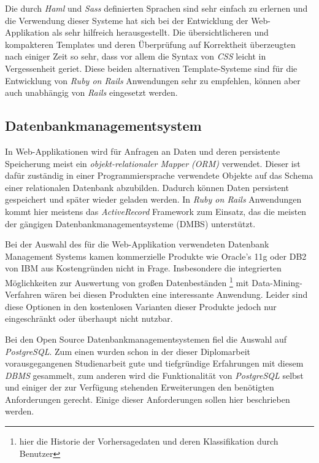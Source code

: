 Die durch \textit{Haml} und \textit{Sass} definierten Sprachen sind
sehr einfach zu erlernen und die Verwendung dieser Systeme hat sich
bei der Entwicklung der Web-Applikation als sehr hilfreich
herausgestellt. Die übersichtlicheren und kompakteren Templates und
deren Überprüfung auf Korrektheit überzeugten nach einiger Zeit so
sehr, dass vor allem die Syntax von \textit{CSS} leicht in
Vergessenheit geriet. Diese beiden alternativen Template-Systeme sind
für die Entwicklung von \textit{Ruby on Rails} Anwendungen sehr zu
empfehlen, können aber auch unabhängig von \textit{Rails} eingesetzt
werden.

\subsection{Datenbankmanagementsystem}

In Web-Applikationen wird für Anfragen an Daten und deren persistente
Speicherung meist ein \textit{objekt-relationaler Mapper (ORM)}
verwendet. Dieser ist dafür zuständig in einer Programmiersprache
verwendete Objekte auf das Schema einer relationalen Datenbank
abzubilden. Dadurch können Daten persistent gespeichert und später
wieder geladen werden. In \textit{Ruby on Rails} Anwendungen kommt
hier meistens das \textit{ActiveRecord} Framework zum Einsatz, das die
meisten der gängigen Datenbankmanagementsysteme (DMBS) unterstützt.

Bei der Auswahl des für die Web-Applikation verwendeten Datenbank
Management Systems kamen kommerzielle Produkte wie Oracle's 11g oder
DB2 von IBM aus Kostengründen nicht in Frage. Insbesondere die
integrierten Möglichkeiten zur Auswertung von großen Datenbeständen
\footnote{hier die Historie der Vorhersagedaten und deren
  Klassifikation durch Benutzer} mit Data-Mining-Verfahren wären bei
diesen Produkten eine interessante Anwendung. Leider sind diese
Optionen in den kostenlosen Varianten dieser Produkte jedoch nur
eingeschränkt oder überhaupt nicht nutzbar.

Bei den Open Source Datenbankmanagementsystemen fiel die Auswahl auf
\textit{PostgreSQL}. Zum einen wurden schon in der dieser Diplomarbeit
vorausgegangenen Studienarbeit gute und tiefgründige Erfahrungen mit
diesem \textit{DBMS} gesammelt, zum anderen wird die Funktionalität
von \textit{PostgreSQL} selbst und einiger der zur Verfügung stehenden
Erweiterungen den benötigten Anforderungen gerecht. Einige dieser
Anforderungen sollen hier beschrieben werden.

